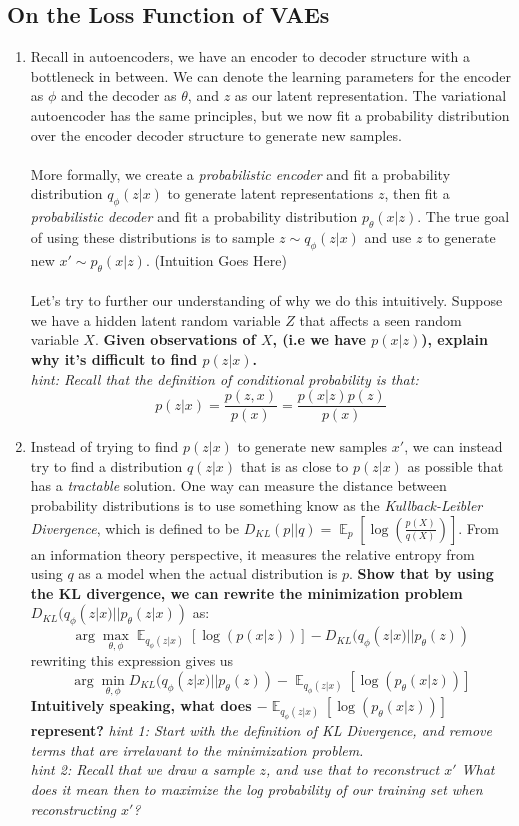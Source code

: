 \documentclass{article}
\DeclareMathOperator{\EX}{\mathbb{E}}%
\begin{document}
\subsection{On the Loss Function of VAEs}
\begin{enumerate}
    \item Recall in autoencoders, we have an encoder to decoder structure with a bottleneck in between. We can denote the learning parameters for the encoder as $\phi$ and the decoder as $\theta$, and $z$ as our latent representation. The variational autoencoder has the same principles, but we now fit a probability distribution over the encoder decoder structure to generate new samples.
    \\
    \\
    More formally, we create a \textit{probabilistic encoder} and fit a probability distribution $q_{\phi}(z|x)$ to generate latent representations $z$, then fit a \textit{probabilistic decoder} and fit a probability distribution $p_{\theta}(x|z)$. The true goal of using these distributions is to sample $z \sim q_{\phi}(z|x)$ and use $z$ to generate new $x' \sim p_{\theta}(x|z)$. (Intuition Goes Here)
    \\
    \\
    Let's try to further our understanding of why we do this intuitively. Suppose we have a hidden latent random variable $Z$ that affects a seen random variable $X$. \textbf{Given observations of $X$, (i.e we have $p(x|z)$), explain why it's difficult to find $p(z|x)$.}
    \\
    \textit{hint: Recall that the definition of conditional probability is that: 
    $$p(z|x) = \frac{p(z, x)}{p(x)} = \frac{p(x | z)p(z)}{p(x)}$$}
    \item Instead of trying to find $p(z|x)$ to generate new samples $x'$, we can instead try to find a distribution $q(z|x)$ that is as close to $p(z|x)$ as possible that has a \textit{tractable} solution. One way can measure the distance between probability distributions is to use something know as the \textit{Kullback-Leibler Divergence}, which is defined to be $D_{KL}(p||q) = \EX_p[\log(\frac{p(X)}{q(X)})]$. From an information theory perspective, it measures the relative entropy from using $q$ as a model when the actual distribution is $p$. \textbf{Show that by using the KL divergence, we can rewrite the minimization problem $D_{KL}(q_{\phi}(z|x) || p_{\theta}(z|x))$} as:
    $$\arg\max_{\theta, \phi}\EX_{q_{\phi}(z|x)}[\log(p(x|z))] - D_{KL}(q_{\phi}(z|x) || p_{\theta}(z))$$
    rewriting this expression gives us 
    $$\arg\min_{\theta, \phi} D_{KL}(q_{\phi}(z|x) || p_{\theta}(z)) - \EX_{q_{\phi}(z|x)}[\log(p_{\theta}(x|z))]$$
    \textbf{Intuitively speaking, what does $-\EX_{q_{\phi}(z|x)}[\log(p_{\theta}(x|z))]$ represent?}
    \textit{hint 1: Start with the definition of KL Divergence, and remove terms that are irrelavant to the minimization problem.}
    \\
    \textit{hint 2: Recall that we draw a sample $z$, and use that to reconstruct $x'$ What does it mean then to maximize the log probability of our training set when reconstructing $x'$?}
\end{enumerate}
\newpage
\end{document}
